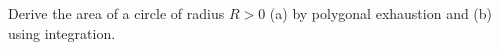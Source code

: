 Derive the area of a circle of radius $ R>0 $ (a) by polygonal exhaustion and (b) using integration.
